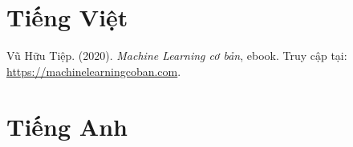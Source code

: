 
\section*{Tiếng Việt}

\begin{enumerate}[label={[\arabic*]}]
    \item \label{tiep} Vũ Hữu Tiệp. (2020). \textit{Machine Learning cơ bản}, ebook. Truy cập tại: \url{https://machinelearningcoban.com}.
\end{enumerate}

\section*{Tiếng Anh}

